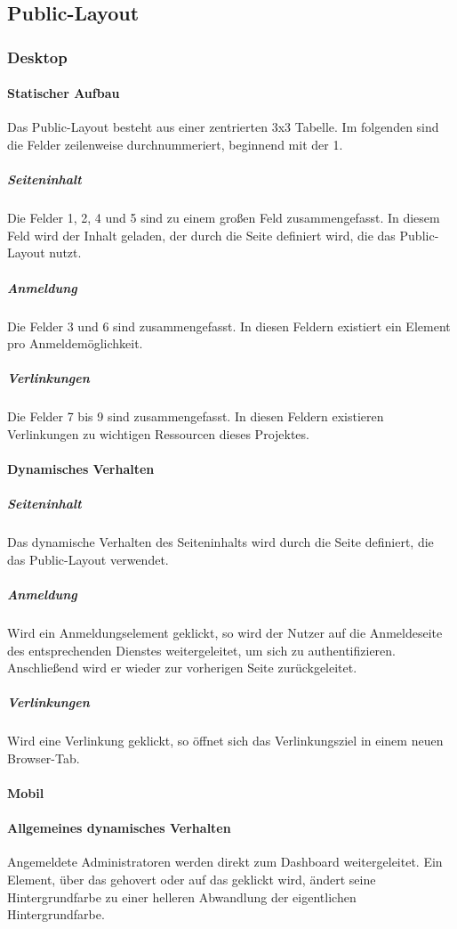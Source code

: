\subsection{Public-Layout}

\subsubsection{Desktop}
\paragraph*{Statischer Aufbau}
Das Public-Layout besteht aus einer zentrierten 3x3 Tabelle.
Im folgenden sind die Felder zeilenweise durchnummeriert, beginnend mit der 1.

\subparagraph*{Seiteninhalt}
Die Felder 1, 2, 4 und 5 sind zu einem großen Feld zusammengefasst. In diesem Feld wird der Inhalt geladen,
der durch die Seite definiert wird, die das Public-Layout nutzt.

\subparagraph*{Anmeldung}
Die Felder 3 und 6 sind zusammengefasst. In diesen Feldern existiert ein Element pro Anmeldemöglichkeit.

\subparagraph*{Verlinkungen}
Die Felder 7 bis 9 sind zusammengefasst. In diesen Feldern existieren Verlinkungen zu wichtigen Ressourcen dieses Projektes.

\paragraph*{Dynamisches Verhalten}
\subparagraph*{Seiteninhalt}
Das dynamische Verhalten des Seiteninhalts wird durch die Seite definiert, die das Public-Layout verwendet.

\subparagraph*{Anmeldung}
Wird ein Anmeldungselement geklickt, so wird der Nutzer auf die Anmeldeseite des entsprechenden Dienstes weitergeleitet, um sich zu authentifizieren.
Anschließend wird er wieder zur vorherigen Seite zurückgeleitet.

\subparagraph*{Verlinkungen}
Wird eine Verlinkung geklickt, so öffnet sich das Verlinkungsziel in einem neuen Browser-Tab.

\paragraph*{Mobil}

\paragraph*{Allgemeines dynamisches Verhalten}
Angemeldete Administratoren werden direkt zum Dashboard weitergeleitet.
Ein Element, über das gehovert oder auf das geklickt wird, ändert seine Hintergrundfarbe zu einer helleren Abwandlung der eigentlichen Hintergrundfarbe.
